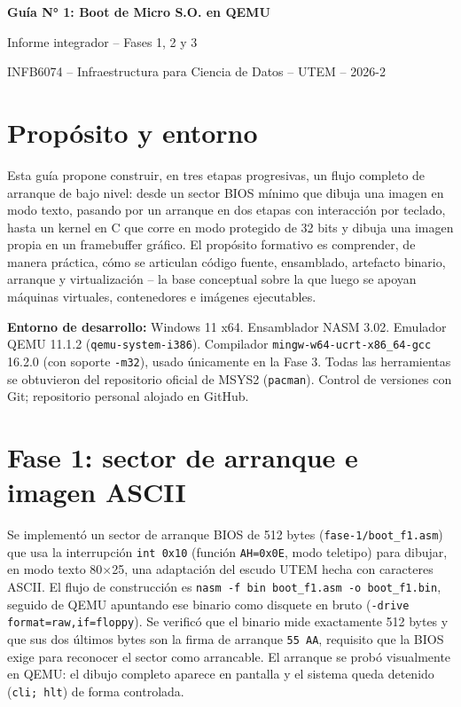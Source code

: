 \documentclass[11pt,a4paper]{article}
\begin{document}
\begin{center}
{\LARGE\bfseries\color{azul} Guía N° 1: Boot de Micro S.O. en QEMU}\par\vspace{4pt}
{\large Informe integrador -- Fases 1, 2 y 3}\par\vspace{4pt}
INFB6074 -- Infraestructura para Ciencia de Datos -- UTEM -- 2026-2
\end{center}

\section{Propósito y entorno}
Esta guía propone construir, en tres etapas progresivas, un flujo completo de arranque de bajo
nivel: desde un sector BIOS mínimo que dibuja una imagen en modo texto, pasando por un
arranque en dos etapas con interacción por teclado, hasta un kernel en C que corre en modo
protegido de 32 bits y dibuja una imagen propia en un framebuffer gráfico. El propósito
formativo es comprender, de manera práctica, cómo se articulan código fuente, ensamblado,
artefacto binario, arranque y virtualización -- la base conceptual sobre la que luego se
apoyan máquinas virtuales, contenedores e imágenes ejecutables.

\textbf{Entorno de desarrollo:} Windows 11 x64. Ensamblador NASM 3.02. Emulador QEMU 11.1.2
(\texttt{qemu-system-i386}). Compilador \texttt{mingw-w64-ucrt-x86\_64-gcc} 16.2.0 (con
soporte \texttt{-m32}), usado únicamente en la Fase 3. Todas las herramientas se obtuvieron
del repositorio oficial de MSYS2 (\texttt{pacman}). Control de versiones con Git; repositorio
personal alojado en GitHub.

\section{Fase 1: sector de arranque e imagen ASCII}
Se implementó un sector de arranque BIOS de 512 bytes (\texttt{fase-1/boot\_f1.asm}) que usa
la interrupción \texttt{int 0x10} (función \texttt{AH=0x0E}, modo teletipo) para dibujar, en
modo texto 80$\times$25, una adaptación del escudo UTEM hecha con caracteres ASCII. El flujo
de construcción es \texttt{nasm -f bin boot\_f1.asm -o boot\_f1.bin}, seguido de QEMU
apuntando ese binario como disquete en bruto (\texttt{-drive format=raw,if=floppy}).
Se verificó que el
binario mide exactamente 512 bytes y que sus dos últimos bytes son la firma de arranque
\texttt{55 AA}, requisito que la BIOS exige para reconocer el sector como arrancable. El
arranque se probó visualmente en QEMU: el dibujo completo aparece en pantalla y el sistema
queda detenido (\texttt{cli; hlt}) de forma controlada.
\end{document}
